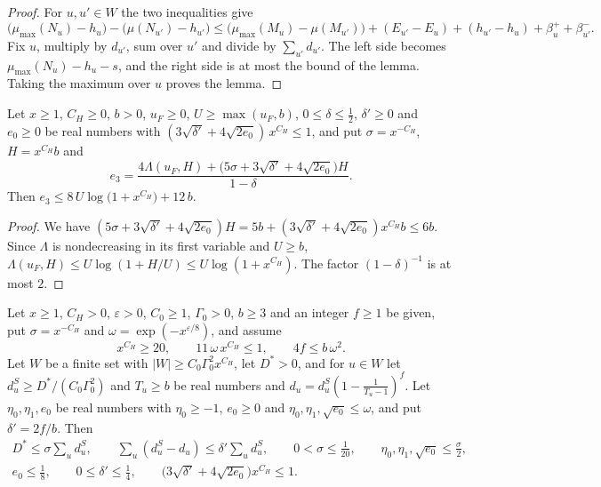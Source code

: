 \begin{proof}
For $u,u'\in W$ the two inequalities give
\[
\big(\mu_{\max}(N_u)-h_u\big)-\big(\mu(N_{u'})-h_{u'}\big)\le\big(\mu_{\max}(M_u)-\mu(M_{u'})\big)+(E_{u'}-E_u)+(h_{u'}-h_u)+\beta^+_u+\beta^-_{u'} .
\]
Fix $u$, multiply by $d_{u'}$, sum over $u'$ and divide by $\sum_{u'}d_{u'}$. The left side becomes $\mu_{\max}(N_u)-h_u-s$, and the right side is at most the bound of the lemma. Taking the maximum over $u$ proves the lemma.
\end{proof}

\begin{corollary}[size of $e_3$]\label{r3:size}
Let $x\ge1$, $C_H\ge0$, $b>0$, $u_F\ge0$, $U\ge\max(u_F,b)$, $0\le\delta\le\frac12$, $\delta'\ge0$ and $e_0\ge0$ be real numbers with $(3\sqrt{\delta'}+4\sqrt{2e_0})\,x^{C_H}\le1$, and put $\sigma=x^{-C_H}$, $H=x^{C_H}b$ and
\[
e_3=\frac{4\Lambda(u_F,H)+\big(5\sigma+3\sqrt{\delta'}+4\sqrt{2e_0}\big)H}{1-\delta}.
\]
Then $e_3\le8\,U\log\big(1+x^{C_H}\big)+12\,b$.
\end{corollary}

\begin{proof}
We have $(5\sigma+3\sqrt{\delta'}+4\sqrt{2e_0})H=5b+(3\sqrt{\delta'}+4\sqrt{2e_0})x^{C_H}b\le6b$. Since $\Lambda$ is nondecreasing in its first variable and $U\ge b$, $\Lambda(u_F,H)\le U\log(1+H/U)\le U\log(1+x^{C_H})$. The factor $(1-\delta)^{-1}$ is at most $2$.
\end{proof}

\begin{lemma}\label{r3:sizecond}
Let $x\ge1$, $C_H>0$, $\varepsilon>0$, $C_0\ge1$, $\Gamma_0>0$, $b\ge3$ and an integer $f\ge1$ be given, put $\sigma=x^{-C_H}$ and $\omega=\exp(-x^{\varepsilon/8})$, and assume
\[
x^{C_H}\ge20,\qquad11\,\omega\,x^{C_H}\le1,\qquad4f\le b\,\omega^2 .
\]
Let $W$ be a finite set with $\lvert W\rvert\ge C_0\Gamma_0^2x^{C_H}$, let $D^*>0$, and for $u\in W$ let $d^S_u\ge D^*/(C_0\Gamma_0^2)$ and $T_u\ge b$ be real numbers and $d_u=d^S_u(1-\frac1{T_u-1})^f$. Let $\eta_0,\eta_1,e_0$ be real numbers with $\eta_0\ge-1$, $e_0\ge0$ and $\eta_0,\eta_1,\sqrt{e_0}\le\omega$, and put $\delta'=2f/b$. Then
\begin{gather*}
D^*\le\sigma\sum_ud^S_u,\qquad\sum_u(d^S_u-d_u)\le\delta'\sum_ud^S_u,\qquad0<\sigma\le\tfrac1{20},\qquad\eta_0,\eta_1,\sqrt{e_0}\le\tfrac\sigma2,\\
e_0\le\tfrac18,\qquad0\le\delta'\le\tfrac14,\qquad\big(3\sqrt{\delta'}+4\sqrt{2e_0}\big)x^{C_H}\le1 .
\end{gather*}
\end{lemma}

